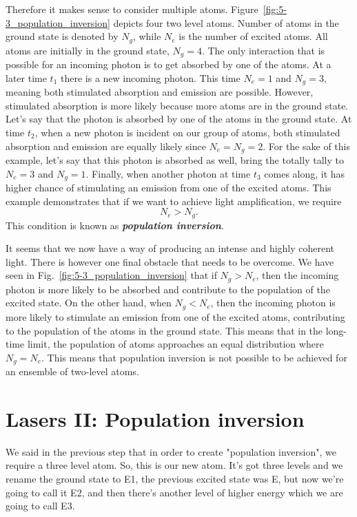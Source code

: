 Therefore it makes sense to consider multiple atoms.
Figure~\ref{fig:5-3_population_inversion} depicts four two level atoms.
Number of atoms in the ground state is denoted by $N_g$, while $N_e$ is the number of excited atoms.
All atoms are initially in the ground state, $N_g=4$.
The only interaction that is possible for an incoming photon is to get absorbed by one of the atoms.
At a later time $t_1$ there is a new incoming photon.
This time $N_e=1$ and $N_g=3$, meaning both stimulated absorption and emission are possible.
However, stimulated absorption is more likely because more atoms are in the ground state.
Let's say that the photon is absorbed by one of the atoms in the ground state.
At time $t_2$, when a new photon is incident on our group of atoms, both stimulated absorption and emission are equally likely since $N_e=N_g=2$.
For the sake of this example, let's say that this photon is absorbed as well, bring the totally tally to $N_e=3$ and $N_g=1$.
Finally, when another photon at time $t_3$ comes along, it has higher chance of stimulating an emission from one of the excited atoms.
This example demonstrates that if we want to achieve light amplification, we require
\begin{equation}
    N_e > N_g.
\end{equation}
This condition is known as \textit{\textbf{population inversion}}.

It seems that we now have a way of producing an intense and highly coherent light.
There is however one final obstacle that needs to be overcome.
We have seen in Fig.~\ref{fig:5-3_population_inversion} that if $N_g > N_e$, then the incoming photon is more likely to be absorbed and contribute to the population of the excited state.
On the other hand, when $N_g < N_e$, then the incoming photon is more likely to stimulate an emission from one of the excited atoms, contributing to the population of the atoms in the ground state.
This means that in the long-time limit, the population of atoms approaches an equal distribution where $N_g = N_e$.
This means that population inversion is not possible to be achieved for an ensemble of two-level atoms.



\section{Lasers II: Population inversion}
\label{sec:5-4_lasers2}

We said in the previous step that in order to create "population inversion", we require a three level atom. So, this is our new atom. It's got three levels and we rename the ground state to E1, the previous excited state was E, but now we're going to call it E2, and then there's another level of higher energy which we are going to call E3.


